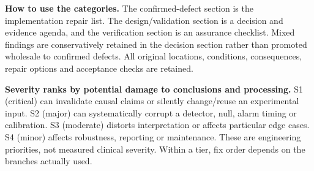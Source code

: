 \documentclass[11pt,a4paper]{article}
\begin{document}
\textbf{How to use the categories.} The confirmed-defect section is the implementation repair list. The design/validation section is a decision and evidence agenda, and the verification section is an assurance checklist. Mixed findings are conservatively retained in the decision section rather than promoted wholesale to confirmed defects. All original locations, conditions, consequences, repair options and acceptance checks are retained.

\textbf{Severity ranks by potential damage to conclusions and processing.}
S1 (critical) can invalidate causal claims or silently change/reuse an experimental
input. S2 (major) can systematically corrupt a detector, null, alarm timing or
calibration. S3 (moderate) distorts interpretation or affects particular edge cases.
S4 (minor) affects robustness, reporting or maintenance. These are engineering
priorities, not measured clinical severity. Within a tier, fix order depends on the
branches actually used.
\end{document}
